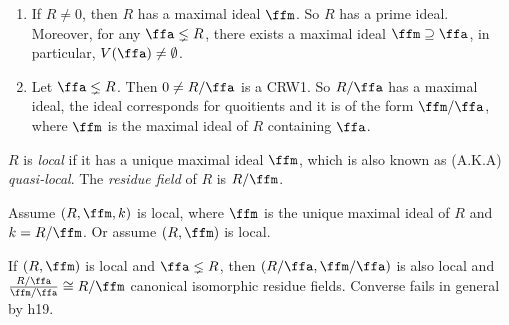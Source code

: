 \begin{remark}[Fact]
    \begin{enumerate}[(1)]
        \item 
            If $R \neq 0$, then $R$ has a maximal ideal $\ffm$. So $R$ has a prime ideal. Moreover, for any $\ffa \lneq R$, there exists a maximal ideal $\ffm \supseteq \ffa$, in particular, $V(\ffa) \neq \emptyset$. 
        \item 
            Let $\ffa \lneq R$. Then $0 \neq R/\ffa$ is a CRW1. So $R/\ffa$ has a maximal ideal, the ideal corresponds for quoitients and it is of the form $\ffm/\ffa$, where $\ffm$ is the maximal ideal of $R$ containing $\ffa$.
    \end{enumerate}
\end{remark}

\begin{definition}
    $R$ is \emph{local} if it has a unique maximal ideal $\ffm$, which is also known as (A.K.A) \emph{quasi-local}. The \emph{residue field} of $R$ is $R/\ffm$. 
\end{definition}

\begin{remark}[Shorthand]
    Assume $(R,\ffm,k)$ is local, where $\ffm$ is the unique maximal ideal of $R$ and $k = R/\ffm$. Or assume $(R,\ffm)$ is local.
\end{remark}

\begin{remark}[Fact]
    If $(R,\ffm)$ is local and $\ffa \lneq R$, then $(R/\ffa,\ffm/\ffa)$ is also local and $\frac{R/\ffa}{\ffm/\ffa} \cong R/\ffm$ canonical isomorphic residue fields. Converse fails in general by h19. 
\end{remark}

